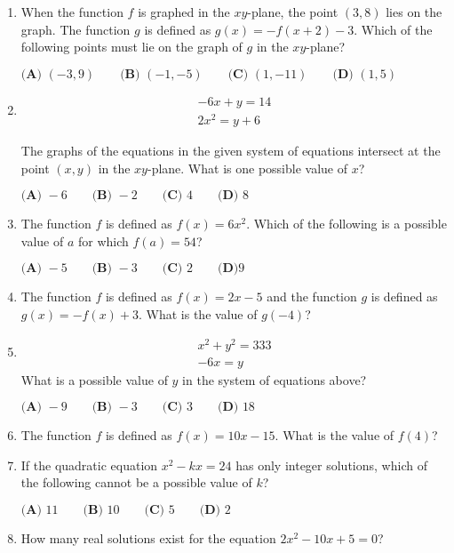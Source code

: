 \documentclass[../satmath.tex]{subfiles}
\begin{document}
\begin{enumerate}[label=\bfseries\arabic*.]
\item When the function $f$ is graphed in the $xy$-plane, the point $(3,8)$ lies on the graph. The function $g$ is defined as $g(x)=-f(x+2)-3$.
Which of the following points must lie on the graph of $g$ in the $xy$-plane?

$\textbf{(A) } (-3,9) \qquad \textbf{(B) } (-1,-5) \qquad \textbf{(C) } (1,-11) \qquad \textbf{(D) } (1,5)$

\item 
\begin{align*}
-6x+y=14\\
2x^2=y+6
\end{align*}

The graphs of the equations in the given system of equations intersect at the point $(x,y)$ in the $xy$-plane. What is one possible value of $x$?

$\textbf{(A) } -6 \qquad \textbf{(B) } -2 \qquad \textbf{(C) } 4 \qquad \textbf{(D) } 8$
 
\item The function $f$ is defined as $f(x)=6x^2$. Which of the following is a possible value of $a$ for which $f(a)=54$?

$\textbf{(A) } -5 \qquad \textbf{(B) } -3 \qquad \textbf{(C) } 2 \qquad \textbf{(D)} 9$
 
\item The function $f$ is defined as $f(x)=2x-5$ and the function $g$ is defined as $g(x)=-f(x)+3$. What is the value of $g(-4)$?

\item
\begin{align*}
x^2+y^2=333\\
-6x=y
\end{align*}
What is a possible value of $y$ in the system of equations above?

$\textbf{(A) } -9 \qquad \textbf{(B) } -3 \qquad \textbf{(C) } 3 \qquad \textbf{(D) } 18$
 
\item The function $f$ is defined as $f(x)=10x-15$. What is the value of $f(4)$?

\item If the quadratic equation $x^2-kx = 24$ has only integer solutions, which of the following cannot be a possible value of $k$?\

$\textbf{(A) } 11 \qquad \textbf{(B) } 10 \qquad \textbf{(C) } 5 \qquad \textbf{(D) } 2$
 
\item How many real solutions exist for the equation $2x^2-10x+5=0$?


\end{enumerate}
\end{document}
